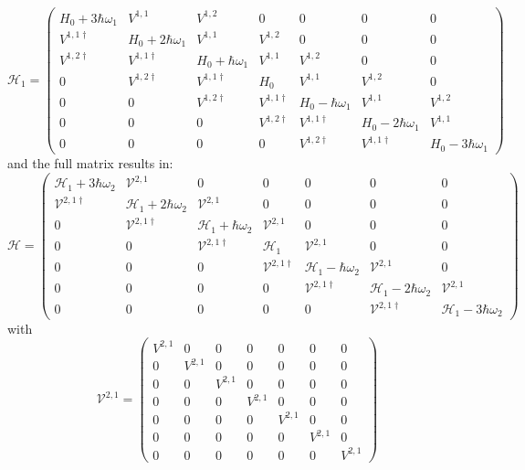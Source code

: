 \documentclass[pra,twocolumn,showkeys,preprintnumbers, amsmath,amssymb, aps,A4paper]{revtex4-1}
\begin{document}
\begin{equaiton}
\begin{equaiton}
\begin{widetext}
\[
\mathcal{H}_1 = \begin{pmatrix}
 H_0 + 3 \hbar \omega_1 & V^{1,1} & V^{1,2} & 0 & 0 & 0 &0 \\
  V^{1,1\dagger} & H_0 + 2 \hbar  \omega_1 & V^{1,1} & V^{1,2} & 0 & 0 & 0 \\
 V^{1,2 \dagger} &  V^{1,1\dagger} & H_0 + \hbar \omega_1 & V^{1,1} & V^{1,2} & 0 & 0 \\
 0 &V^{1,2 \dagger} &  V^{1,1 \dagger} & H_0  & V^{1,1}  & V^{1,2} & 0  \\
 0 & 0 &V^{1,2 \dagger} &  V^{1,1 \dagger} & H_0 - \hbar \omega_1 & V^{1,1} & V^{1,2}   \\
 0 & 0 & 0 &V^{1,2 \dagger} &  V^{1,1 \dagger} & H_0 - 2 \hbar \omega_1 & V^{1,1} \\
 0 & 0 & 0 & 0 &V^{1,2 \dagger} &  V^{1,1 \dagger} & H_0 - 3 \hbar \omega_1 
\end{pmatrix}
\]
\noindent
and the full matrix results in:
\[
\mathcal{H} = \begin{pmatrix}
 \mathcal{H}_1 + 3 \hbar \omega_2 & \mathcal{V}^{2,1} & 0 & 0 & 0 & 0 &0 \\
  \mathcal{V}^{2,1\dagger} & \mathcal{H}_1 + 2 \hbar  \omega_2 & \mathcal{V}^{2,1} & 0 & 0 & 0 & 0 \\
 0 &  \mathcal{V}^{2,1\dagger} & \mathcal{H}_1 + \hbar \omega_2 & \mathcal{V}^{2,1} & 0 & 0 & 0 \\
 0 & 0 &  \mathcal{V}^{2,1 \dagger} & \mathcal{H}_1  & \mathcal{V}^{2,1}  &0 & 0  \\
 0 & 0 & 0 &  \mathcal{V}^{2,1 \dagger} & \mathcal{H}_1 - \hbar \omega_2 & \mathcal{V}^{2,1} & 0   \\
 0 & 0 & 0 &0 &  \mathcal{V}^{2,1 \dagger} & \mathcal{H}_1 - 2 \hbar \omega_2 & \mathcal{V}^{2,1} \\
 0 & 0 & 0 & 0 & 0 &  \mathcal{V}^{2,1 \dagger} & \mathcal{H}_1 - 3 \hbar \omega_2
\end{pmatrix}
\]
with
\[
\mathcal{V}^{2,1} = \begin{pmatrix}
  V^{2,1} & 0 & 0 & 0 & 0 & 0 &0 \\
  0&V^{2,1} & 0 & 0 & 0 & 0 & 0  \\
  0&0&V^{2,1} & 0 & 0 & 0 & 0  \\
  0&0&0&V^{2,1} & 0 & 0 & 0 \\
  0&0&0&0&V^{2,1} & 0 & 0  \\
  0&0&0&0&0&V^{2,1} & 0 \\
  0&0&0&0&0&0&V^{2,1}  
\end{pmatrix}
\]
\end{widetext}


\end{equaiton}
\end{equaiton}
\end{document}
